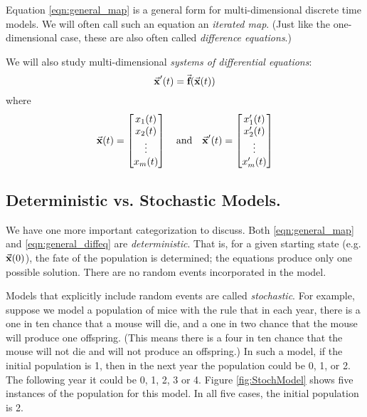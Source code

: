 Equation \eqref{eqn:general_map}
is a general form for multi-dimensional
discrete time models.
We will often call such an equation an
\emph{iterated map}.
 (Just like the one-dimensional
case, these are also often called \emph{difference equations}.)

We will also study multi-dimensional
\emph{systems of differential equations}:
\begin{equation}
   \vec{\textbf{x}}'(t) = \vec{\textbf{f}}(\vec{\textbf{x}}(t))
\label{eqn:general_diffeq}
\end{equation}
where
\begin{equation}
   \vec{\textbf{x}}(t) = \begin{bmatrix}x_1(t) \\ x_2(t) \\ \vdots \\ x_m(t)\end{bmatrix}
   \quad
   \textrm{and}
   \quad
   \vec{\textbf{x}}'(t) = \begin{bmatrix}x_1'(t) \\ x_2'(t) \\ \vdots \\ x_m'(t)\end{bmatrix}
\end{equation}

\subsection*{Deterministic vs. Stochastic Models.}
We have one more important categorization to discuss.
Both \eqref{eqn:general_map} and \eqref{eqn:general_diffeq}
are \emph{deterministic}.
That is, for a given starting state (e.g. $\vec{\textbf{x}}(0)$),
the fate of the population is determined;
the equations produce only one possible solution.
There are no random events incorporated in the model.

Models that explicitly include random events are 
called \emph{stochastic}.
For example, suppose we model a population of mice
with the rule that in each year, there is a one in ten
chance that a mouse will die, and a one in two chance that
the mouse will produce one offspring.
(This means there is a four in ten chance that the mouse
will not die and will not produce an offspring.)
In such a model, if the initial population is 1, then
in the next year the population could be 0, 1, or 2.
The following year it could be 0, 1, 2, 3 or 4.
Figure \ref{fig:StochModel} shows five instances of
the population for this model. In all five cases,
the initial population is 2.

